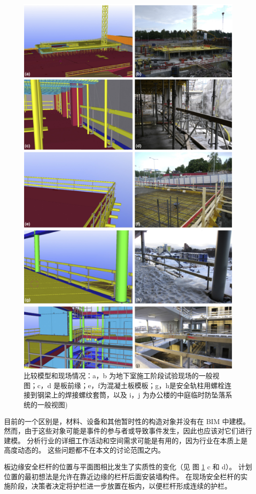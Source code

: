 \begin{figure}[thbp!]
    \centering
    \includegraphics[width=0.8\linewidth]{res/c4f5.png}
    \caption{比较模型和现场情况：a，b 为地下室施工阶段试验现场的一般视图；c，d 是板前缘；e，f为混凝土板模板；g，h是安全轨柱用螺栓连接到钢梁上的焊接螺纹套筒，以及 i，j 为办公楼的中庭临时防坠落系统的一般视图)}
    \label{fig:c4f5}
\end{figure}

目前的一个区别是，材料、设备和其他暂时性的构造对象并没有在 BIM 中建模。
然而，由于这些对象可能是事件的参与者或导致事件发生，因此也应该对它们进行建模。
分析行业的详细工作活动和空间需求可能是有用的，因为行业在本质上是高度动态的。
这些问题都不在本文的讨论范围之内。

板边缘安全栏杆的位置与平面图相比发生了实质性的变化（见 图 \ref{fig:c4f5} c 和 d）。
计划位置的最初想法是允许在靠近边缘的栏杆后面安装墙构件。
在现场安全栏杆的实施阶段，决策者决定将护栏进一步放置在板内，以便栏杆形成连续的护栏。


